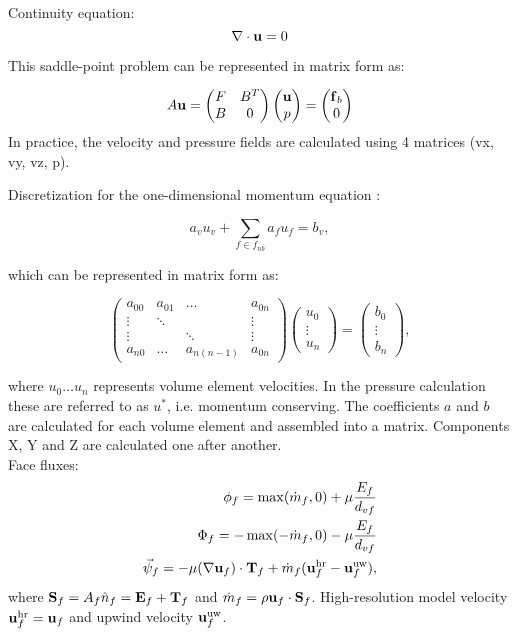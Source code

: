 \documentclass[12pt]{article}
\newcommand{\vb}[1]{\text{\textbf{#1}}}
\begin{document}
Continuity equation:
$$
\nabla \cdot \vb u = 0
$$

This saddle-point problem can be represented in matrix form as:

$$
A \vb u = \begin{pmatrix}
  F & B^T \\
  B & 0
\end{pmatrix}
\begin{pmatrix}
  \vb u \\
  p
\end{pmatrix} =
\begin{pmatrix}
  \vb f_b \\
  0
\end{pmatrix}
$$
  In practice, the velocity and pressure fields are calculated using 4 matrices (vx, vy, vz, p).

Discretization for the one-dimensional momentum equation \cite{mou}:

\begin{equation}
  a_v u_v + \sum_{f \in f_{nb}} a_f u_f = b_v,
\end{equation}

which can be represented in matrix form as:

$$
\begin{pmatrix}
  a_{00} & a_{01} & \dots & a_{0n} \\
  \vdots & \ddots &  & \vdots \\
  \vdots &  & \ddots & \vdots \\
  a_{n0} & \dots & a_{n (n - 1)} & a_{0n}
\end{pmatrix}
\begin{pmatrix}
  u_0 \\
  \vdots \\
  u_n
\end{pmatrix} =
\begin{pmatrix}
  b_{0} \\
  \vdots \\
  b_n
  \end{pmatrix},
  $$

  where $u_0 \dots u_n$ represents volume element velocities. In the pressure calculation these are referred to as $u^*$, i.e. momentum conserving. The coefficients $a$ and $b$ are calculated for each volume element and assembled into a matrix. Components X, Y and Z are calculated one after another.\\

  Face fluxes:
  \begin{align}
    \phi_f = \max(\dot m_f, 0) + \mu \frac{E_f}{d_{vf}} \\
    \Phi_f = -\max(-\dot m_f, 0) - \mu \frac{E_f}{d_{vf}} \\
    \vec \psi_f = - \mu (\nabla \vb u_f) \cdot \vb T_f + \dot m_f (\vb u_f^{\text{hr}} - \vb u_f^{\text{uw}}),
  \end{align}
  where $\vb S_f = A_f \hat n_f = \vb E_f + \vb T_f$ and $\dot m_f = \rho \vb u_f \cdot \vb S_f$. High-resolution model velocity $\vb u_f^{\text{hr}} = \vb u_f$ and upwind velocity $\vb u_f^{\text{uw}}$.\\
\end{document}
